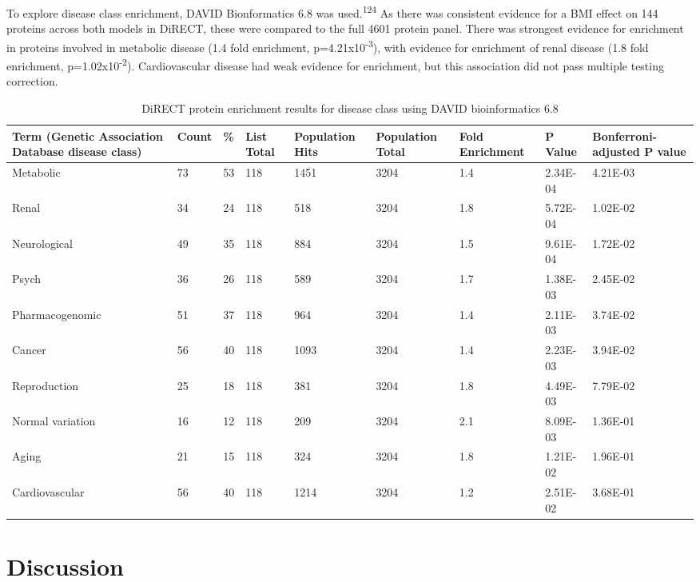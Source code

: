 \documentclass[11pt,twoside]{bristolthesis}
\begin{document}
To explore disease class enrichment, DAVID Bionformatics 6.8 was used.\textsuperscript{124} As there was consistent evidence for a BMI effect on 144 proteins across both models in DiRECT, these were compared to the full 4601 protein panel. There was strongest evidence for enrichment in proteins involved in metabolic disease (1.4 fold enrichment, p=4.21x10\textsuperscript{-3}), with evidence for enrichment of renal disease (1.8 fold enrichment, p=1.02x10\textsuperscript{-2}). Cardiovascular disease had weak evidence for enrichment, but this association did not pass multiple testing correction.
\begin{landscape}\begin{table}

\caption{\label{tab:DAVID-enrichment-DiRECT}DiRECT protein enrichment results for disease class using DAVID bioinformatics 6.8}
\centering
\begin{tabu} to 
\toprule
Term (Genetic Association Database disease class) & Count & \% & List Total &   Population Hits & Population Total & Fold Enrichment & P Value & Bonferroni-adjusted P value\\
\midrule
Metabolic & 73 & 53 & 118 & 1451 & 3204 & 1.4 & 2.34E-04 & 4.21E-03\\
Renal & 34 & 24 & 118 & 518 & 3204 & 1.8 & 5.72E-04 & 1.02E-02\\
Neurological & 49 & 35 & 118 & 884 & 3204 & 1.5 & 9.61E-04 & 1.72E-02\\
Psych & 36 & 26 & 118 & 589 & 3204 & 1.7 & 1.38E-03 & 2.45E-02\\
Pharmacogenomic & 51 & 37 & 118 & 964 & 3204 & 1.4 & 2.11E-03 & 3.74E-02\\
\addlinespace
Cancer & 56 & 40 & 118 & 1093 & 3204 & 1.4 & 2.23E-03 & 3.94E-02\\
Reproduction & 25 & 18 & 118 & 381 & 3204 & 1.8 & 4.49E-03 & 7.79E-02\\
Normal variation & 16 & 12 & 118 & 209 & 3204 & 2.1 & 8.09E-03 & 1.36E-01\\
Aging & 21 & 15 & 118 & 324 & 3204 & 1.8 & 1.21E-02 & 1.96E-01\\
Cardiovascular & 56 & 40 & 118 & 1214 & 3204 & 1.2 & 2.51E-02 & 3.68E-01\\
\bottomrule
\end{tabu}
\end{table}
\end{landscape}
\hypertarget{discussion-4}{%
\section{Discussion}\label{discussion-4}}
\end{document}
